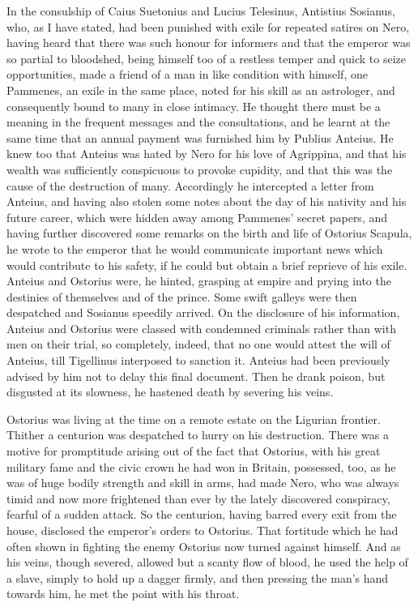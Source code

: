In the consulship of Caius Suetonius and Lucius Telesinus, Antistius Sosianus, who, as I have stated, had been punished with exile for repeated satires on Nero, having heard that there was such honour for informers and that the emperor was so partial to bloodshed, being himself too of a restless temper and quick to seize opportunities, made a friend of a man in like condition with himself, one Pammenes, an exile in the same place, noted for his skill as an astrologer, and consequently bound to many in close intimacy. He thought there must be a meaning in the frequent messages and the consultations, and he learnt at the same time that an annual payment was furnished him by Publius Anteius. He knew too that Anteius was hated by Nero for his love of Agrippina, and that his wealth was sufficiently conspicuous to provoke cupidity, and that this was the cause of the destruction of many. Accordingly he intercepted a letter from Anteius, and having also stolen some notes about the day of his nativity and his future career, which were hidden away among Pammenes' secret papers, and having further discovered some remarks on the birth and life of Ostorius Scapula, he wrote to the emperor that he would communicate important news which would contribute to his safety, if he could but obtain a brief reprieve of his exile. Anteius and Ostorius were, he hinted, grasping at empire and prying into the destinies of themselves and of the prince. Some swift galleys were then despatched and Sosianus speedily arrived. On the disclosure of his information, Anteius and Ostorius were classed with condemned criminals rather than with men on their trial, so completely, indeed, that no one would attest the will of Anteius, till Tigellinus interposed to sanction it. Anteius had been previously advised by him not to delay this final document. Then he drank poison, but disgusted at its slowness, he hastened death by severing his veins.


Ostorius was living at the time on a remote estate on the Ligurian frontier. Thither a centurion was despatched to hurry on his destruction. There was a motive for promptitude arising out of the fact that Ostorius, with his great military fame and the civic crown he had won in Britain, possessed, too, as he was of huge bodily strength and skill in arms, had made Nero, who was always timid and now more frightened than ever by the lately discovered conspiracy, fearful of a sudden attack. So the centurion, having barred every exit from the house, disclosed the emperor's orders to Ostorius. That fortitude which he had often shown in fighting the enemy Ostorius now turned against himself. And as his veins, though severed, allowed but a scanty flow of blood, he used the help of a slave, simply to hold up a dagger firmly, and then pressing the man's hand towards him, he met the point with his throat.

